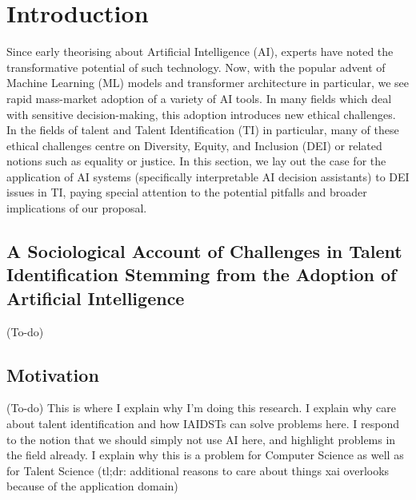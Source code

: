 

\chapter{\label{ch:intro}Introduction} 

\minitoc

Since early theorising about Artificial Intelligence (AI), experts have noted the transformative potential of such technology. Now, with the popular advent of Machine Learning (ML) models and transformer architecture in particular, we see rapid mass-market adoption of a variety of AI tools. In many fields which deal with sensitive decision-making, this adoption introduces new ethical challenges. In the fields of talent and Talent Identification (TI) in particular, many of these ethical challenges centre on Diversity, Equity, and Inclusion (DEI) or related notions such as equality or justice. In this section, we lay out the case for the application of AI systems (specifically interpretable AI decision assistants) to DEI issues in TI, paying special attention to the potential pitfalls and broader implications of our proposal.

\section{A Sociological Account of Challenges in Talent Identification Stemming from the Adoption of Artificial Intelligence}
(To-do)

\section{Motivation}
(To-do) This is where I explain why I'm doing this research. I explain why care about talent identification and how IAIDSTs can solve problems here. I respond to the notion that we should simply not use AI here, and highlight problems in the field already. I explain why this is a problem for Computer Science as well as for Talent Science (tl;dr: additional reasons to care about things xai overlooks because of the application domain)

